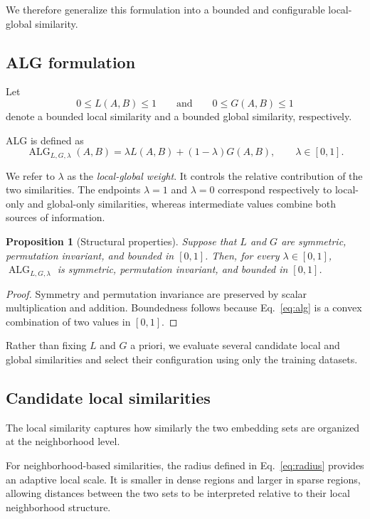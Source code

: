 \documentclass[preprint,12pt]{elsarticle}
\newcommand{\ALG}{\operatorname{ALG}}
\newtheorem{proposition}{Proposition}
\begin{document}
We therefore generalize this formulation into a bounded and configurable
local-global similarity.

\subsection{ALG formulation}

Let
\[
0\leq L(A,B)\leq1
\qquad\text{and}\qquad
0\leq G(A,B)\leq1
\]
denote a bounded local similarity and a bounded global similarity,
respectively.

ALG is defined as
\begin{equation}
\ALG_{L,G,\lambda}(A,B)
=
\lambda L(A,B)
+
(1-\lambda)G(A,B),
\qquad
\lambda\in[0,1].
\label{eq:alg}
\end{equation}

We refer to $\lambda$ as the \emph{local-global weight}. It controls the
relative contribution of the two similarities. The endpoints $\lambda=1$
and $\lambda=0$ correspond respectively to local-only and global-only
similarities, whereas intermediate values combine both sources of
information.

\begin{proposition}[Structural properties]
Suppose that $L$ and $G$ are symmetric, permutation invariant, and bounded
in $[0,1]$. Then, for every $\lambda\in[0,1]$,
$\ALG_{L,G,\lambda}$ is symmetric, permutation invariant, and bounded
in $[0,1]$.
\end{proposition}

\begin{proof}
Symmetry and permutation invariance are preserved by scalar multiplication and
addition. Boundedness follows because Eq.~\eqref{eq:alg} is a convex
combination of two values in $[0,1]$.
\end{proof}

Rather than fixing $L$ and $G$ a priori, we evaluate several candidate local
and global similarities and select their configuration using only the
training datasets.

\subsection{Candidate local similarities}

The local similarity captures how similarly the two embedding sets are
organized at the neighborhood level.

For neighborhood-based similarities, the radius defined in
Eq.~\eqref{eq:radius} provides an adaptive local scale. It is smaller in dense
regions and larger in sparse regions, allowing distances between the two sets
to be interpreted relative to their local neighborhood structure.
\end{document}

